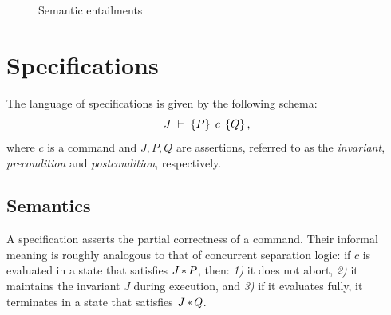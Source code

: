 \documentclass[11pt]{report}
\begin{document}
\begin{figure}[ht]
	\centering
	\caption{\label{fig:entailments}Semantic entailments}
\end{figure}


\section{Specifications}
\label{sec:specifications}

The language of specifications is given by the following schema: \[ J\;\vdash\;\left\lbrace P \right\rbrace\;c\;\left\lbrace Q \right\rbrace, \] where $c$ is a command and $J,P,Q$ are assertions, referred to as the \emph{invariant}, \emph{precondition} and \emph{postcondition}, respectively. 

\subsection{Semantics}
\label{specification-semantics}

A specification asserts the partial correctness of a command. Their informal meaning is roughly analogous to that of concurrent separation logic: if $c$ is evaluated in a state that satisfies $J \operatorname{\ast} P$, then: \emph{1)} it does not abort, \emph{2)} it maintains the invariant $J$ during execution, and \emph{3)} if it evaluates fully, it terminates in a state that satisfies $J \operatorname{\ast} Q$. 
\end{document}

